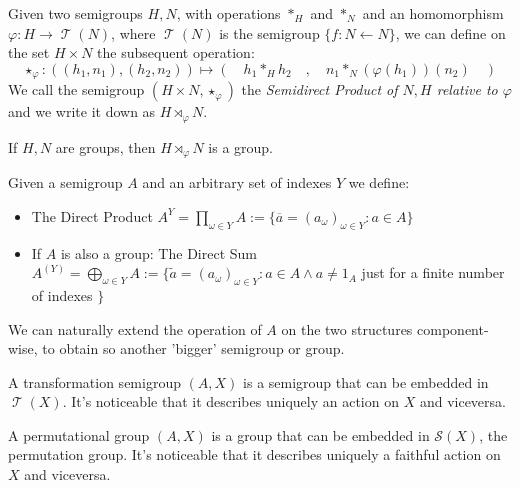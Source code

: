 \documentclass[mat1]{fmfdeloTS}
\DeclareMathOperator{\Tran}{\mathcal{T}}
\begin{document}
\begin{definition}
Given two semigroups $H,N$, with operations $\ast_H$ and $\ast_N$ and an homomorphism $\varphi:H\longrightarrow \Tran(N)$, where $\Tran(N)$ is the semigroup $\{ f:N\longleftarrow N\}$, we can define on the set $H\times N$ the subsequent operation:
\[
\star_\varphi:((h_1,n_1),(h_2,n_2))\longmapsto (\quad h_1\ast_H h_2\quad,\quad n_1\ast_N(\varphi(h_1))(n_2)\quad)
\]
We call the semigroup $(H\times N,\star_\varphi)$ the  \textit{Semidirect Product of $N,H$ relative to $\varphi$} and we write it down as $H\rtimes_{\varphi} N$.
\end{definition}

\begin{proposition}
If $H,N$ are groups, then $H\rtimes_{\varphi} N$ is a group.
\end{proposition}


\begin{definition}
Given a semigroup $A$ and an arbitrary set of indexes $Y$ we define:
\begin{itemize}
\item 
\begin{description}
The Direct Product
$A^Y = \prod_{\omega\in Y} A:=\{ \overline{a}=(a_\omega )_{\omega\in Y} : a\in A\}$
\end{description}
\item 
\begin{description}
If $A$ is also a group: The Direct Sum 
$A^{(Y)} = \bigoplus_{\omega\in Y} A:=\{ \widetilde{a}=(a_\omega )_{\omega\in Y} : a\in A \wedge a\neq 1_A$ just for a finite number of indexes $\}$
\end{description}
\end{itemize}
We can naturally extend the operation of $A$ on the two structures component-wise, to obtain so another 'bigger' semigroup or group.
\end{definition}

\begin{definition}
A transformation semigroup $(A,X)$ is a semigroup that can be embedded in $\Tran(X)$. It's noticeable that it describes uniquely an action on $X$ and viceversa.
\end{definition}

\begin{definition}
A permutational group $(A,X)$ is a group that can be embedded in $\mathcal{S} (X)$, the permutation group. It's noticeable that it describes uniquely a faithful action on $X$ and viceversa.
\end{definition}
\end{document}
